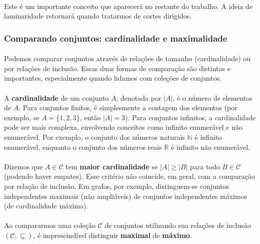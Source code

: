 \documentclass[12pt,a4paper]{article}
\def\emph#1{#1}%
\begin{document}
\paragraph{}
Este é um importante conceito que aparecerá no restante do trabalho. A ideia de laminaridade retornará quando tratarmos de cortes dirigidos.

\subsubsection{Comparando conjuntos: cardinalidade e maximalidade}

\paragraph{}
Podemos comparar conjuntos através de relações de tamanho (cardinalidade) ou por relações de inclusão. Essas duas formas de comparação são distintas e importantes, especialmente quando lidamos com coleções de conjuntos.

\paragraph{}
A \textbf{cardinalidade} de um conjunto \(A\), denotada por \(|A|\), é o número de elementos de \(A\). Para conjuntos finitos, é simplesmente a contagem dos elementos (por exemplo, se \(A=\{1,2,3\}\), então \(|A|=3\)). Para conjuntos infinitos, a cardinalidade pode ser mais complexa, envolvendo conceitos como infinito enumerável e não enumerável. Por exemplo, o conjunto dos números naturais \(\mathbb{N}\) é infinito enumerável, enquanto o conjunto dos números reais \(\mathbb{R}\) é infinito não enumerável.

\paragraph{}
Dizemos que \(A\in\mathcal{C}\) tem \textbf{maior cardinalidade} se \(|A|\ge |B|\) para todo \(B\in\mathcal{C}\) (podendo haver empates). Esse critério não coincide, em geral, com a comparação por relação de inclusão. Em grafos, por exemplo, distinguem-se conjuntos independentes \emph{maximais} (não ampliáveis) de conjuntos independentes \emph{máximos} (de cardinalidade máxima).

\paragraph{}
Ao compararmos uma coleção \(\mathcal{C}\) de conjuntos utilizando sua relações de inclusão \((\mathcal{C},\subseteq)\), é imprescindível distinguir \textbf{maximal} de \textbf{máximo}.
\end{document}
